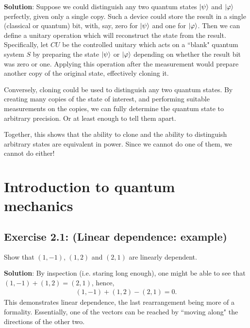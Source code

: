 \documentclass{book}
\begin{document}
    \textbf{Solution}: Suppose we could distinguish any two quantum states $\ket{\psi}$ and $\ket{\varphi}$ perfectly, given only a single copy. Such a device could store the result in a single (classical or quantum) bit, with, say, zero for $\ket{\psi}$ and one for $\ket{\varphi}$. Then we can define a unitary operation which will reconstruct the state from the result. Specifically, let $CU$ be the controlled unitary which acts on a ``blank" quantum system $S$ by preparing the state $\ket{\psi}$ or $\ket{\varphi}$ depending on whether the result bit was zero or one. Applying this operation after the measurement would prepare another copy of the original state, effectively cloning it. 
    
    Conversely, cloning could be used to distinguish any two quantum states. By creating many copies of the state of interest, and performing suitable measurements on the copies, we can fully determine the quantum state to arbitrary precision. Or at least enough to tell them apart. 
    
    Together, this shows that the ability to clone and the ability to distinguish arbitrary states are equivalent in power. Since we cannot do one of them, we cannot do either!

\chapter{Introduction to quantum mechanics}

\section*{Exercise 2.1: (Linear dependence: example)}
    Show that $(1,-1)$, $(1, 2)$ and $(2, 1)$ are linearly dependent.
    
    \textbf{Solution}: By inspection (i.e. staring long enough), one might be able to see that $(1,-1) + (1,2) = (2,1)$, hence,
    \begin{align}
        (1,-1)+(1,2) -(2,1) = 0.
    \end{align}
    This demonstrates linear dependence, the last rearrangement being more of a formality. Essentially, one of the vectors can be reached by ``moving along" the directions of the other two.
    
\end{document}
